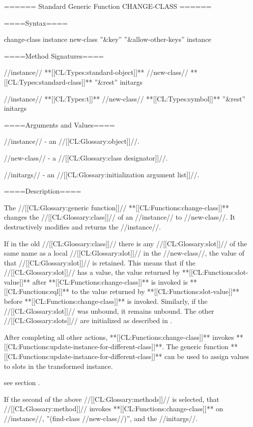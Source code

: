 ====== Standard Generic Function CHANGE-CLASS ======

====Syntax====


\DefgenWithValues change-class {instance new-class ''&key'' ''&allow-other-keys''} {instance}

====Method Signatures====


 {//instance// **[[CL:Types:standard-object]]** //new-class// **[[CL:Types:standard-class]]** ''&rest'' initargs}

 {//instance// **[[CL:Types:t]]** //new-class// **[[CL:Types:symbol]]** ''&rest'' initargs}

====Arguments and Values====

//instance// - an //[[CL:Glossary:object]]//.

//new-class// - a //[[CL:Glossary:class designator]]//.


//initargs// - an //[[CL:Glossary:initialization argument list]]//.

====Description====

The //[[CL:Glossary:generic function]]// **[[CL:Functions:change-class]]** changes the //[[CL:Glossary:class]]// of an //instance// to //new-class//. It destructively modifies and returns the //instance//.

If in the old //[[CL:Glossary:class]]// there is any //[[CL:Glossary:slot]]// of the same name as a local //[[CL:Glossary:slot]]// in the //new-class//, the value of that //[[CL:Glossary:slot]]// is retained. This means that if the //[[CL:Glossary:slot]]// has a value, the value returned by **[[CL:Functions:slot-value]]** after **[[CL:Functions:change-class]]** is invoked is **[[CL:Functions:eql]]** to the value returned by **[[CL:Functions:slot-value]]** before **[[CL:Functions:change-class]]** is invoked. Similarly, if the //[[CL:Glossary:slot]]// was unbound, it remains unbound. The other //[[CL:Glossary:slots]]// are initialized as described in \secref\ChangingInstanceClass.

After completing all other actions, **[[CL:Functions:change-class]]** invokes **[[CL:Functions:update-instance-for-different-class]]**. The generic function **[[CL:Functions:update-instance-for-different-class]]** can be used to assign values to slots in the transformed instance.

see section {\secref\InitNewLocalSlots}.



If the second of the above //[[CL:Glossary:methods]]// is selected, that //[[CL:Glossary:method]]// invokes **[[CL:Functions:change-class]]** on //instance//, ''(find-class //new-class//)'', and the //initargs//.


